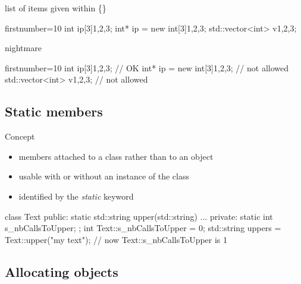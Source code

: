 \begin{frame}[fragile]
  \begin{exampleblock}{list of items given within \{\}}
    \begin{cppcode*}{firstnumber=10}
     int ip[3]{1,2,3};
     int* ip = new int[3]{1,2,3};
     std::vector<int> v{1,2,3};
    \end{cppcode*}
  \end{exampleblock}
  \pause
  \begin{block}{ nightmare}
    \begin{cppcode*}{firstnumber=10}
     int ip[3]{1,2,3};            // OK
     int* ip = new int[3]{1,2,3}; // not allowed
     std::vector<int> v{1,2,3};   // not allowed
    \end{cppcode*}
  \end{block}
\end{frame}

\subsection[static]{Static members}

\begin{frame}[fragile]
  \begin{block}{Concept}
    \begin{itemize}
    \item members attached to a class rather than to an object
    \item usable with or without an instance of the class
    \item identified by the {\it static} keyword
    \end{itemize}
  \end{block}
  \begin{cppcode}
    class Text {
    public:
      static std::string upper(std::string) {...}
    private:
      static int s_nbCallsToUpper;
    };
    int Text::s_nbCallsToUpper = 0;
    std::string uppers = Text::upper("my text");
    // now Text::s_nbCallsToUpper is 1
  \end{cppcode}
\end{frame}

\subsection[new]{Allocating objects}

